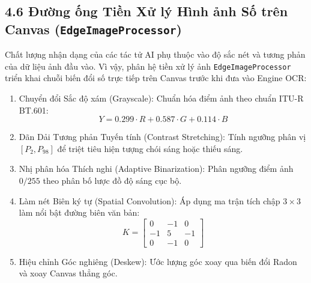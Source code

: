 \documentclass[12pt,a4paper]{report}
\begin{document}
\subsection*{4.6 Đường ống Tiền Xử lý Hình ảnh Số trên Canvas (\texttt{EdgeImageProcessor})}
Chất lượng nhận dạng của các tác tử AI phụ thuộc vào độ sắc nét và tương phản của dữ liệu ảnh đầu vào. Vì vậy, phân hệ tiền xử lý ảnh \texttt{EdgeImageProcessor} triển khai chuỗi biến đổi số trực tiếp trên Canvas trước khi đưa vào Engine OCR:
\begin{enumerate}[label=\arabic*.]
  \item Chuyển đổi Sắc độ xám (Grayscale): Chuẩn hóa điểm ảnh theo chuẩn ITU-R BT.601:
        \begin{equation}
          Y = 0.299 \cdot R + 0.587 \cdot G + 0.114 \cdot B
        \end{equation}
  \item Dãn Dải Tương phản Tuyến tính (Contrast Stretching): Tính ngưỡng phân vị $[P_2, P_{98}]$ để triệt tiêu hiện tượng chói sáng hoặc thiếu sáng.
  \item Nhị phân hóa Thích nghi (Adaptive Binarization): Phân ngưỡng điểm ảnh $0/255$ theo phân bố lược đồ độ sáng cục bộ.
  \item Làm nét Biên ký tự (Spatial Convolution): Áp dụng ma trận tích chập $3 \times 3$ làm nổi bật đường biên văn bản:
        \begin{equation}
          K = \begin{bmatrix} 0 & -1 & 0 \\ -1 & 5 & -1 \\ 0 & -1 & 0 \end{bmatrix}
        \end{equation}
  \item Hiệu chỉnh Góc nghiêng (Deskew): Ước lượng góc xoay qua biến đổi Radon và xoay Canvas thẳng góc.
\end{enumerate}
\end{document}
